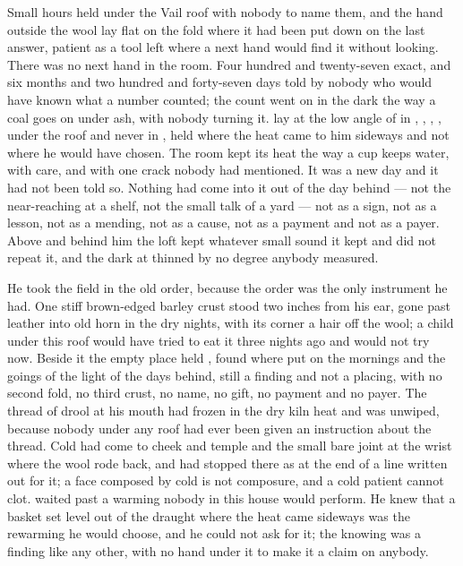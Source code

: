 
Small hours held under the Vail roof with nobody to name them, and the hand outside the wool lay flat on the fold where it had been put down on the last answer, patient as a tool left where a next hand would find it without looking. There was no next hand in the room. Four hundred and twenty-seven exact, and six months and two hundred and forty-seven days told by nobody who would have known what a number counted; the count went on in the dark the way a coal goes on under ash, with nobody turning it.  lay at the low angle of  in , , , , under the roof and never in , held where the heat came to him sideways and not where he would have chosen. The room kept its heat the way a cup keeps water, with care, and with one crack nobody had mentioned. It was a new day and it had not been told so. Nothing had come into it out of the day behind --- not the near-reaching at a shelf, not the small talk of a yard --- not as a sign, not as a lesson, not as a mending, not as a cause, not as a payment and not as a payer. Above and behind him the loft kept whatever small sound it kept and did not repeat it, and the dark at  thinned by no degree anybody measured.

He took the field in the old order, because the order was the only instrument he had. One stiff brown-edged barley crust stood two inches from his ear, gone past leather into old horn in the dry nights, with its corner a hair off the wool; a child under this roof would have tried to eat it three nights ago and would not try now. Beside it the empty place held , found where put on the mornings and the goings of the light of the days behind, still a finding and not a placing, with no second fold, no third crust, no name, no gift, no payment and no payer. The thread of drool at his mouth had frozen in the dry kiln heat and was unwiped, because nobody under any roof had ever been given an instruction about the thread. Cold had come to cheek and temple and the small bare joint at the wrist where the wool rode back, and had stopped there as at the end of a line written out for it; a face composed by cold is not composure, and a cold patient cannot clot.  waited past a warming nobody in this house would perform. He knew that a basket set level out of the draught where the heat came sideways was the rewarming he would choose, and he could not ask for it; the knowing was a finding like any other, with no hand under it to make it a claim on anybody.

